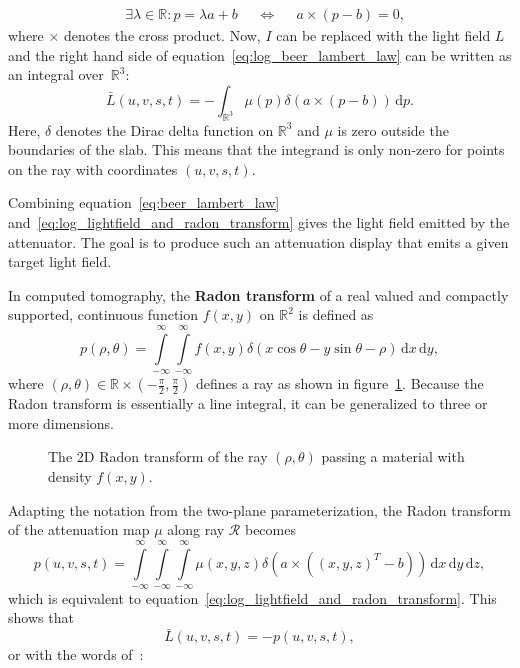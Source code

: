 \begin{align}
& \exists \lambda \in \mathbb{R} : p = \lambda a + b & & \iff & & a \times (p - b) = 0, 
\end{align} 
where $\times$ denotes the cross product.
Now, $I$ can be replaced with the light field $L$ and the right hand side of equation~\ref{eq:log_beer_lambert_law} can be written as an integral over~$\mathbb{R}^3$:
\begin{equation}\label{eq:log_lightfield_and_radon_transform}
\bar{L}(u, v, s, t) = 	%
-\int_{\mathbb{R}^3}
\mu(p) \delta ( a \times (p - b) ) \, 
\mathrm{d}p.
\end{equation}
Here, $\delta$ denotes the Dirac delta function on $\mathbb{R}^3$ and $\mu$ is zero outside the boundaries of the slab. 
This means that the integrand is only non-zero for points on the ray with coordinates $(u, v, s, t)$.

Combining equation~\ref{eq:beer_lambert_law} and~\ref{eq:log_lightfield_and_radon_transform} gives the light field emitted by the attenuator.
The goal is to produce such an attenuation display that emits a given target light field.

In computed tomography, the \textbf{Radon transform} of a real valued and compactly supported, continuous function $f(x, y)$ on $\mathbb{R}^2$ is defined as
\begin{equation}
p(\rho, \theta) = 	\int \limits_{-\infty}^{\infty} 
\int \limits_{-\infty}^{\infty}
f(x, y) \delta (x \cos \theta - y \sin \theta - \rho) \, 
\mathrm{d}x \,
\mathrm{d}y,
\end{equation}
where $(\rho, \theta) \in \mathbb{R} \times \left(- \frac{\pi}{2}, \frac{\pi}{2}\right)$ defines a ray as shown in figure~\ref{fig:radon_transform_2D_sketch}.
Because the Radon transform is essentially a line integral, it can be generalized to three or more dimensions.
\begin{figure}[tb]
	\centering
	
	\caption{The 2D Radon transform of the ray $(\rho, \theta)$ passing a material with density $f(x, y)$.}
	\label{fig:radon_transform_2D_sketch}
\end{figure}
Adapting the notation from the two-plane parameterization, the Radon transform of the attenuation map $\mu$ along ray $\mathcal{R}$ becomes
\begin{equation}
p(u, v, s, t) = 	\int \limits_{-\infty}^{\infty} 
\int \limits_{-\infty}^{\infty}
\int \limits_{-\infty}^{\infty}
\mu(x, y, z) \delta \left(a \times \left((x, y, z)^T - b\right) \right) \, 
\mathrm{d}x \,
\mathrm{d}y \,
\mathrm{d}z, 
\end{equation}
which is equivalent to equation~\ref{eq:log_lightfield_and_radon_transform}.
This shows that
\begin{equation}\label{eq:log_light_field_negative_radon}
\bar{L}(u, v, s, t) = -p(u, v, s, t), 
\end{equation}
or with the words of~\cite{WetzsteinTomo}: 

